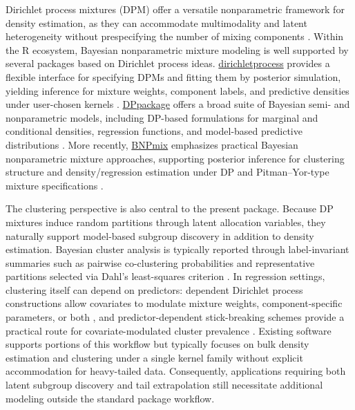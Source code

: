 \documentclass[article]{jss}\usepackage[]{graphicx}\usepackage[]{xcolor}
\begin{document}
Dirichlet process mixtures (DPM) offer a versatile nonparametric
framework for density estimation, as they can accommodate multimodality
and latent heterogeneity without prespecifying the number of mixing
components \citep{EscobarWest1995}.  Within the \textsf{R} ecosystem,
Bayesian nonparametric mixture modeling is well supported by several
packages based on Dirichlet process ideas.
\href{https://cran.r-project.org/package=dirichletprocess}{\textsf{dirichletprocess}}
provides a flexible interface for specifying DPMs and fitting them by
posterior simulation, yielding inference for mixture weights, component
labels, and predictive densities under user-chosen kernels
\citep{dirichletprocess_pkg}.
\href{https://cran.r-project.org/package=DPpackage}{\textsf{DPpackage}}
offers a broad suite of Bayesian semi- and nonparametric models,
including DP-based formulations for marginal and conditional densities,
regression functions, and model-based predictive distributions
\citep{jara2011DPpackage}.  More recently,
\href{https://cran.r-project.org/package=BNPmix}{\textsf{BNPmix}}
emphasizes practical Bayesian nonparametric mixture approaches,
supporting posterior inference for clustering structure and
density/regression estimation under DP and Pitman--Yor-type mixture
specifications \citep{canale2021BNPmix}.

The clustering perspective is also central to the present package.
Because DP mixtures induce random partitions through latent allocation
variables, they naturally support model-based subgroup discovery in
addition to density estimation.  Bayesian cluster analysis is typically
reported through label-invariant summaries such as pairwise
co-clustering probabilities \citep{Binder1978} and representative
partitions selected via Dahl's least-squares criterion
\citep{Dahl2006}.  In regression settings, clustering itself can depend
on predictors: dependent Dirichlet process constructions allow
covariates to modulate mixture weights, component-specific parameters,
or both
\citep{MacEachern1999,MacEachern2000,DeIorio2004,Quintana2022}, and
predictor-dependent stick-breaking schemes provide a practical route
for covariate-modulated cluster prevalence \citep{Ren2011}.  Existing
software supports portions of this workflow but typically focuses on
bulk density estimation and clustering under a single kernel family
without explicit accommodation for heavy-tailed data.  Consequently,
applications requiring both latent subgroup discovery and tail
extrapolation still necessitate additional modeling outside the
standard package workflow.
\end{document}
